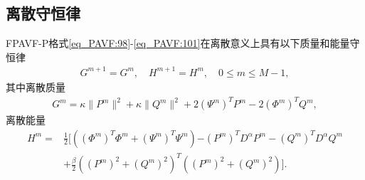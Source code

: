 \subsection{离散守恒律}
\begin{theorem}\label{thm_PAVF:4}
FPAVF-P格式\eqref{eq_PAVF:98}-\eqref{eq_PAVF:101}在离散意义上具有以下质量和能量守恒律
\begin{align}\label{eq_PAVF:11141}
G^{m+1}=G^{m} , \quad H^{m+1}=H^{m} , \quad 0 \leq m \leq M-1 , 
\end{align}
其中离散质量
\begin{align}\label{eq_PAVF:11142}
G^{m}=\kappa\|P^{m}\|^2+\kappa\|Q^{m}\|^2+2 \left(\Psi^{m}\right)^T P^{m}-2 \left(\varPhi^{m}\right)^T Q^{m} , 
\end{align}
离散能量
\begin{align}
H^{m}=&\frac{1}{2}[((\varPhi^{m})^{T}\varPhi^{m}+(\Psi^{m})^{T}\Psi^{m}){-(P^{m})^{T} D^{\alpha} P^{m}-(Q^{m})^{T} D^{\alpha} Q^{m}}\nonumber\\
&+\frac{\beta}{2}((P^{m})^2+(Q^{m})^2)^{T}((P^{m})^2+(Q^{m})^2)] . \label{eq_PAVF:800}
\end{align}
\end{theorem}

